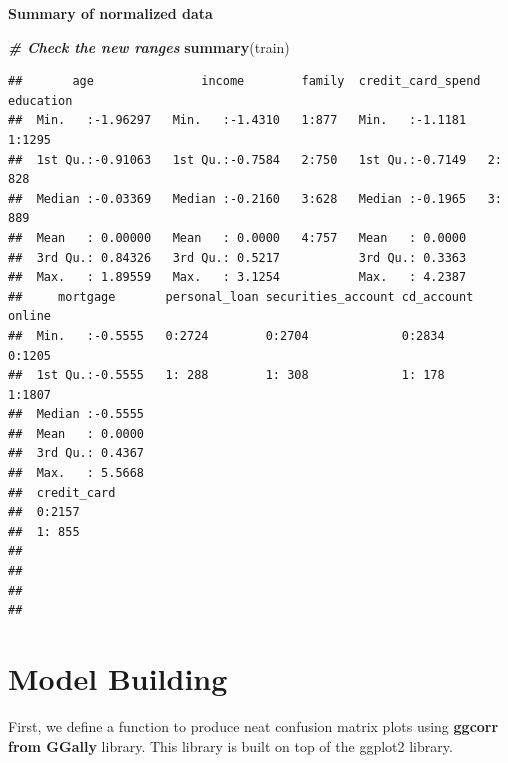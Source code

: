 \documentclass[
]{article}
\newenvironment{Shaded}{\begin{snugshade}}{\end{snugshade}}
\newcommand{\CommentTok}[1]{\textcolor[rgb]{0.00,0.40,1.00}{\textbf{\textit{#1}}}}
\newcommand{\KeywordTok}[1]{\textcolor[rgb]{0.26,0.66,0.93}{\textbf{#1}}}
\newcommand{\NormalTok}[1]{\textcolor[rgb]{0.74,0.68,0.62}{#1}}
\begin{document}
\pagebreak

\textbf{Summary of normalized data}

\begin{Shaded}
\begin{Highlighting}[]
\CommentTok{# Check the new ranges}
\KeywordTok{summary}\NormalTok{(train)}
\end{Highlighting}
\end{Shaded}

\begin{verbatim}
##       age               income        family  credit_card_spend education
##  Min.   :-1.96297   Min.   :-1.4310   1:877   Min.   :-1.1181   1:1295   
##  1st Qu.:-0.91063   1st Qu.:-0.7584   2:750   1st Qu.:-0.7149   2: 828   
##  Median :-0.03369   Median :-0.2160   3:628   Median :-0.1965   3: 889   
##  Mean   : 0.00000   Mean   : 0.0000   4:757   Mean   : 0.0000            
##  3rd Qu.: 0.84326   3rd Qu.: 0.5217           3rd Qu.: 0.3363            
##  Max.   : 1.89559   Max.   : 3.1254           Max.   : 4.2387            
##     mortgage       personal_loan securities_account cd_account online  
##  Min.   :-0.5555   0:2724        0:2704             0:2834     0:1205  
##  1st Qu.:-0.5555   1: 288        1: 308             1: 178     1:1807  
##  Median :-0.5555                                                       
##  Mean   : 0.0000                                                       
##  3rd Qu.: 0.4367                                                       
##  Max.   : 5.5668                                                       
##  credit_card
##  0:2157     
##  1: 855     
##             
##             
##             
## 
\end{verbatim}

\pagebreak

\hypertarget{model-building}{%
\section{Model Building}\label{model-building}}

First, we define a function to produce neat confusion matrix plots using
\textbf{ggcorr from GGally} library. This library is built on top of the
ggplot2 library.
\end{document}
